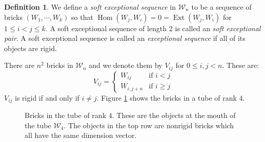 \documentclass[11pt]{amsart}
\theoremstyle{definition}
\newtheorem{defn}[thm]{Definition}
\theoremstyle{remark}
\numberwithin{equation}{section}
\DeclareMathOperator{\Hom}{Hom}%
\DeclareMathOperator{\Ext}{Ext}%
\newcommand{\cW}{\ensuremath{{\mathcal{W}}}}
\begin{document}
\begin{defn}
We define a \emph{soft exceptional sequence} in $\cW_n$ to be a sequence of bricks $(W_1,\cdots,W_k)$ so that $\Hom(W_j,W_i)=0=\Ext(W_j,W_i)$ for $1\le i<j\le k$. A soft exceptional sequence of length 2 is called an \emph{soft exceptional pair}. A soft exceptional sequence is called an \emph{exceptional sequence} if all of its objects are rigid.
\end{defn}

There are $n^2$ bricks in $\cW_n$ and we denote them by $V_{ij}$ for $0\le i,j<n$. These are:
\[
	V_{ij}=\begin{cases} W_{ij} & \text{if } i<j\\
   W_{i,j+n} & \text{if } i\ge j
    \end{cases}
\]
$V_{ij}$ is rigid if and only if $i\neq j$. Figure \ref{fig: bricks in Wn} shows the bricks in a tube of rank $4$.

%
\begin{figure}[htbp]
\begin{center}
\caption{Bricks in the tube of rank 4. These are the objects at the mouth of the tube $\cW_4$. The objects in the top row are nonrigid bricks which all have the same dimension vector.}
\label{fig: bricks in Wn}
\end{center}
\end{figure}
%
\end{document}
